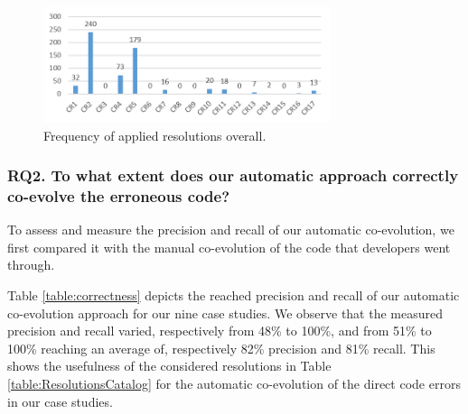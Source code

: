 \begin{figure}
	\centering
\includegraphics[width=0.75\textwidth]{./pics/chapter1pics/FrequencyICSE.png}
\caption{Frequency of applied resolutions overall.}
\label{fig:frequency_resolutions}
\end{figure}


\subsubsection{RQ2. To what extent does our automatic approach correctly co-evolve the erroneous code?}

To assess and measure the precision and recall of our automatic co-evolution, we first compared it with the manual co-evolution of the code that developers went through. 

Table \ref{table:correctness} depicts the reached precision and recall of our automatic co-evolution approach for our nine case studies. We observe that the measured precision and recall varied, respectively from 48\% to 100\%, and from 51\% to 100\% reaching an average of, respectively 82\% precision and 81\% recall. 
%
%
This shows the usefulness of the considered resolutions in Table \ref{table:ResolutionsCatalog} for the automatic co-evolution of the direct code errors in our case studies. %

